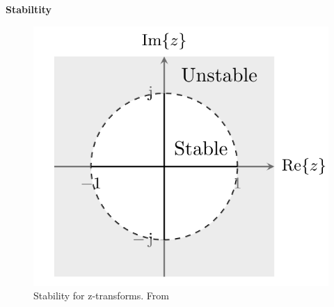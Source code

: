 \textbf{Stabiltity}
\begin{figure}[H]
   \centering
   \includegraphics[width=12cm]{image/stability_z-transform.png} 
   \caption{Stability for z-transforms. From \cite{st}}
   \label{fig:stability_z-transform}
\end{figure}

